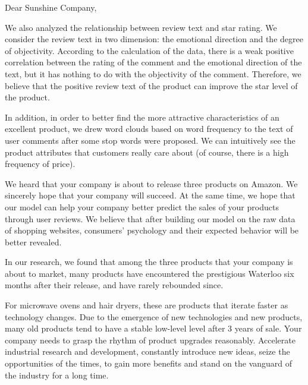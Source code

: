 \documentclass{mcmthesis}
\begin{document}
\begin{letter}{Dear Sunshine Company, }
    
    
    We also analyzed the relationship between review text and star rating. We consider the review text in two dimension: the emotional direction and the degree of objectivity. According to the calculation of the data, there is a weak positive correlation between the rating of the comment and the emotional direction of the text, but it has nothing to do with the objectivity of the comment. Therefore, we believe that the positive review text of the product can improve the star level of the product.
    
    In addition, in order to better find the more attractive characteristics of an excellent product, we drew word clouds based on word frequency to the text of user comments after some stop words were proposed. We can intuitively see the product attributes that customers really care about (of course, there is a high frequency of price).
    
    We heard that your company is about to release three products on Amazon. We sincerely hope that your company will succeed. At the same time, we hope that our model can help your company better predict the sales of your products through user reviews. We believe that after building our model on the raw data of shopping websites, consumers' psychology and their expected behavior will be better revealed. 
    
    In our research, we found that among the three products that your company is about to market, many products have encountered the prestigious Waterloo six months after their release, and have rarely rebounded since.

     For microwave ovens and hair dryers, these are products that iterate faster as technology changes. Due to the emergence of new technologies and new products, many old products tend to have a stable low-level level after 3 years of sale. Your company needs to grasp the rhythm of product upgrades reasonably. Accelerate industrial research and development, constantly introduce new ideas, seize the opportunities of the times, to gain more benefits and stand on the vanguard of the industry for a long time.


\end{letter}
\end{document}
